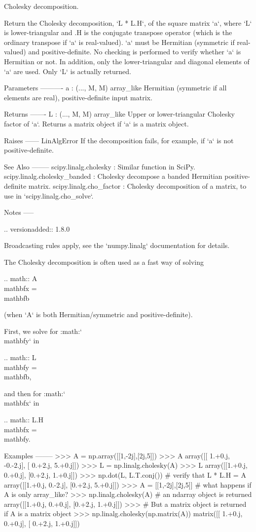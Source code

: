 \begin{DoxyVerb}Cholesky decomposition.

Return the Cholesky decomposition, `L * L.H`, of the square matrix `a`,
where `L` is lower-triangular and .H is the conjugate transpose operator
(which is the ordinary transpose if `a` is real-valued).  `a` must be
Hermitian (symmetric if real-valued) and positive-definite. No
checking is performed to verify whether `a` is Hermitian or not.
In addition, only the lower-triangular and diagonal elements of `a`
are used. Only `L` is actually returned.

Parameters
----------
a : (..., M, M) array_like
    Hermitian (symmetric if all elements are real), positive-definite
    input matrix.

Returns
-------
L : (..., M, M) array_like
    Upper or lower-triangular Cholesky factor of `a`.  Returns a
    matrix object if `a` is a matrix object.

Raises
------
LinAlgError
   If the decomposition fails, for example, if `a` is not
   positive-definite.

See Also
--------
scipy.linalg.cholesky : Similar function in SciPy.
scipy.linalg.cholesky_banded : Cholesky decompose a banded Hermitian
                               positive-definite matrix.
scipy.linalg.cho_factor : Cholesky decomposition of a matrix, to use in
                          `scipy.linalg.cho_solve`.

Notes
-----

.. versionadded:: 1.8.0

Broadcasting rules apply, see the `numpy.linalg` documentation for
details.

The Cholesky decomposition is often used as a fast way of solving

.. math:: A \\mathbf{x} = \\mathbf{b}

(when `A` is both Hermitian/symmetric and positive-definite).

First, we solve for :math:`\\mathbf{y}` in

.. math:: L \\mathbf{y} = \\mathbf{b},

and then for :math:`\\mathbf{x}` in

.. math:: L.H \\mathbf{x} = \\mathbf{y}.

Examples
--------
>>> A = np.array([[1,-2j],[2j,5]])
>>> A
array([[ 1.+0.j, -0.-2.j],
       [ 0.+2.j,  5.+0.j]])
>>> L = np.linalg.cholesky(A)
>>> L
array([[1.+0.j, 0.+0.j],
       [0.+2.j, 1.+0.j]])
>>> np.dot(L, L.T.conj()) # verify that L * L.H = A
array([[1.+0.j, 0.-2.j],
       [0.+2.j, 5.+0.j]])
>>> A = [[1,-2j],[2j,5]] # what happens if A is only array_like?
>>> np.linalg.cholesky(A) # an ndarray object is returned
array([[1.+0.j, 0.+0.j],
       [0.+2.j, 1.+0.j]])
>>> # But a matrix object is returned if A is a matrix object
>>> np.linalg.cholesky(np.matrix(A))
matrix([[ 1.+0.j,  0.+0.j],
        [ 0.+2.j,  1.+0.j]])\end{DoxyVerb}
